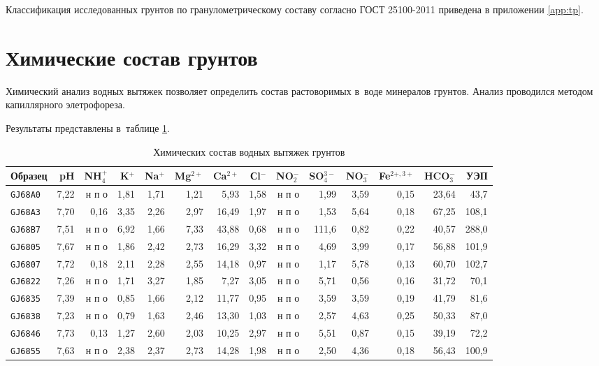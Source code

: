 Классификация исследованных грунтов по гранулометрическому составу согласно ГОСТ 25100-2011 приведена в приложении \ref{app:tp}.

 
\section{Химические состав грунтов}

Химический анализ водных вытяжек позволяет определить состав растоворимых в~воде минералов грунтов.
Анализ проводился методом капиллярного элетрофореза. 

Результаты представлены в~таблице \ref{tab:chem}.

\begin{table}[]
    \centering
    \tiny
    \caption{Химических состав водных вытяжек грунтов} \label{tab:chem}
    \begin{tabular}{@{}lrrrrrrrrrrrrr@{}}
    \toprule
    Образец & pH & NH$_4^+$ &	K$^+$ & Na$^+$ & Mg$^{2+}$ & Ca$^{2+}$ &	Сl$^-$ &	NO$_2^-$	   & SO$_4^{3-}$ &	NO$_3^-$ &	Fe$^{2+,3+}$ &	HCO$_3^-$   & УЭП \\ \midrule
    \texttt{GJ68A0} & 7,22 & н п о & 1,81 & 1,71 & 1,21 &  5,93 & 1,58 & н п о &  1,99 & 3,59 & 0,15 & 23,64 &  43,7 \\
    \texttt{GJ68A3} & 7,70 & 0,16  & 3,35 & 2,26 & 2,97 & 16,49 & 1,97 & н п о &  1,53 & 5,64 & 0,18 & 67,25 & 108,1 \\
    \texttt{GJ68B7} & 7,51 & н п о & 6,92 & 1,66 & 7,33 & 43,88 & 0,68 & н п о & 111,6 & 0,82 & 0,22 & 40,57 & 288,0 \\
    \texttt{GJ6805} & 7,67 & н п о & 1,86 & 2,42 & 2,73 & 16,29 & 3,32 & н п о &  4,69 & 3,99 & 0,17 & 56,88 & 101,9 \\
    \texttt{GJ6807} & 7,72 & 0,18  & 2,11 & 2,28 & 2,55 & 14,18 & 0,97 & н п о &  1,17 & 5,78 & 0,13 & 60,70 & 102,7 \\
    \texttt{GJ6822} & 7,26 & н п о & 1,71 & 3,27 & 1,85 &  7,27 & 3,05 & н п о &  5,71 & 0,56 & 0,16 & 31,72 &  70,1 \\
    \texttt{GJ6835} & 7,39 & н п о & 0,85 & 1,66 & 2,12 & 11,77 & 0,95 & н п о &  3,59 & 3,59 & 0,19 & 41,79 &  81,6 \\
    \texttt{GJ6838} & 7,23 & н п о & 0,79 & 1,63 & 2,46 & 13,30 & 1,03 & н п о &  2,57 & 4,63 & 0,25 & 50,33 &  87,0 \\
    \texttt{GJ6846} & 7,73 & 0,13  & 1,27 & 2,60 & 2,03 & 10,25 & 2,97 & н п о &  5,51 & 0,87 & 0,15 & 39,19 &  72,2 \\
    \texttt{GJ6855} & 7,63 & н п о & 2,38 & 2,37 & 2,73 & 14,28 & 1,98 & н п о &  2,50 & 4,36 & 0,18 & 56,43 & 100,9 \\

\end{tabular}
\end{table}
